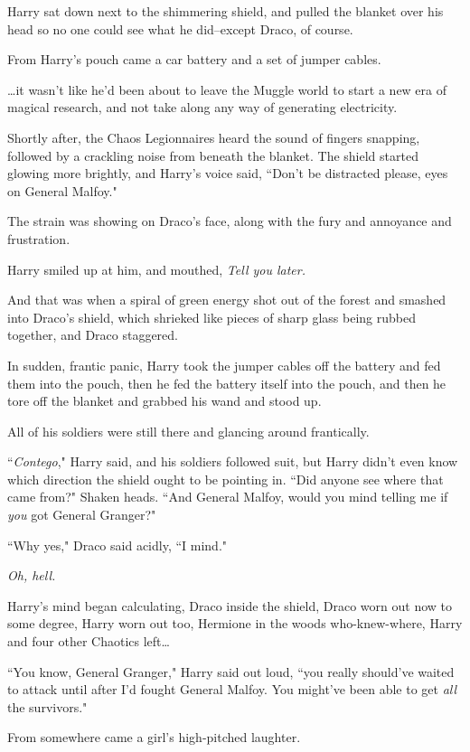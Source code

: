 Harry sat down next to the shimmering shield, and pulled the blanket over his head so no one could see what he did\---except Draco, of course.

From Harry's pouch came a car battery and a set of jumper cables.

{\ldots}it wasn't like he'd been about to leave the Muggle world to start a new era of magical research, and not take along any way of generating electricity.

Shortly after, the Chaos Legionnaires heard the sound of fingers snapping, followed by a crackling noise from beneath the blanket. The shield started glowing more brightly, and Harry's voice said, ``Don't be distracted please, eyes on General Malfoy."

The strain was showing on Draco's face, along with the fury and annoyance and frustration.

Harry smiled up at him, and mouthed, \emph{Tell you later.}

And that was when a spiral of green energy shot out of the forest and smashed into Draco's shield, which shrieked like pieces of sharp glass being rubbed together, and Draco staggered.

In sudden, frantic panic, Harry took the jumper cables off the battery and fed them into the pouch, then he fed the battery itself into the pouch, and then he tore off the blanket and grabbed his wand and stood up.

All of his soldiers were still there and glancing around frantically.

``\emph{Contego}," Harry said, and his soldiers followed suit, but Harry didn't even know which direction the shield ought to be pointing in. ``Did anyone see where that came from?" Shaken heads. ``And General Malfoy, would you mind telling me if \emph{you} got General Granger?"

``Why yes," Draco said acidly, ``I mind."

\emph{Oh, hell.}

Harry's mind began calculating, Draco inside the shield, Draco worn out now to some degree, Harry worn out too, Hermione in the woods who-knew-where, Harry and four other Chaotics left{\ldots}

``You know, General Granger," Harry said out loud, ``you really should've waited to attack until after I'd fought General Malfoy. You might've been able to get \emph{all} the survivors."

From somewhere came a girl's high-pitched laughter.


